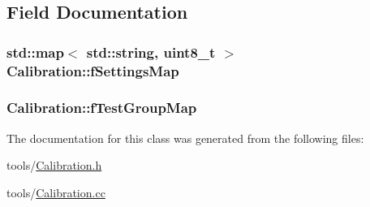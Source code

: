 \subsection{Field Documentation}
\hypertarget{class_calibration_a37b07f82cd185ea60bcbcf7cf602af49}{
\subsubsection[{f\-Settings\-Map}]{\setlength{\rightskip}{0pt plus 5cm}std\-::map$<$ std\-::string, uint8\-\_\-t $>$ Calibration\-::f\-Settings\-Map\hspace{0.3cm}{\ttfamily [private]}}}\label{class_calibration_a37b07f82cd185ea60bcbcf7cf602af49}
\hypertarget{class_calibration_ac79d5ebc2766ebc9c5faf384a05581b0}{
\subsubsection[{f\-Test\-Group\-Map}]{ Calibration\-::f\-Test\-Group\-Map\hspace{0.3cm}{\ttfamily [private]}}}\label{class_calibration_ac79d5ebc2766ebc9c5faf384a05581b0}


The documentation for this class was generated from the following files\-:\begin{DoxyCompactItemize}
\item 
tools/\hyperlink{_calibration_8h}{Calibration.\-h}\item 
tools/\hyperlink{_calibration_8cc}{Calibration.\-cc}\end{DoxyCompactItemize}
